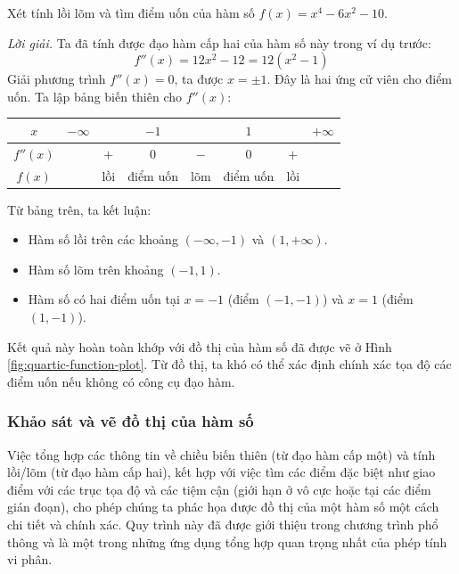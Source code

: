 \begin{example}
Xét tính lồi lõm và tìm điểm uốn của hàm số $f(x) = x^4 - 6x^2 -10$.

\textit{Lời giải.}
Ta đã tính được đạo hàm cấp hai của hàm số này trong ví dụ trước:
$$ f''(x) = 12x^2 - 12 = 12(x^2 - 1) $$
Giải phương trình $f''(x)=0$, ta được $x = \pm 1$. Đây là hai ứng cử viên cho điểm uốn. Ta lập bảng biến thiên cho $f''(x)$:

\begin{center}
\begin{tabular}{c|ccccccc}
$x$ & $-\infty$ & & $-1$ & & $1$ & & $+\infty$ \\
\hline
$f''(x)$ & & $+$ & $0$ & $-$ & $0$ & $+$ & \\
\hline
$f(x)$ & & lồi & điểm uốn & lõm & điểm uốn & lồi & \\
\end{tabular}
\end{center}
Từ bảng trên, ta kết luận:
\begin{itemize}
    \item Hàm số lồi trên các khoảng $(-\infty, -1)$ và $(1, +\infty)$.
    \item Hàm số lõm trên khoảng $(-1, 1)$.
    \item Hàm số có hai điểm uốn tại $x=-1$ (điểm $(-1, -1)$) và $x=1$ (điểm $(1, -1)$).
\end{itemize}
Kết quả này hoàn toàn khớp với đồ thị của hàm số đã được vẽ ở Hình \ref{fig:quartic-function-plot}. Từ đồ thị, ta khó có thể xác định chính xác tọa độ các điểm uốn nếu không có công cụ đạo hàm.
\end{example}

\subsubsection{Khảo sát và vẽ đồ thị của hàm số}
\label{subsubsec:graphing-functions}

Việc tổng hợp các thông tin về chiều biến thiên (từ đạo hàm cấp một) và tính lồi/lõm (từ đạo hàm cấp hai), kết hợp với việc tìm các điểm đặc biệt như giao điểm với các trục tọa độ và các tiệm cận (giới hạn ở vô cực hoặc tại các điểm gián đoạn), cho phép chúng ta phác họa được đồ thị của một hàm số một cách chi tiết và chính xác. Quy trình này đã được giới thiệu trong chương trình phổ thông và là một trong những ứng dụng tổng hợp quan trọng nhất của phép tính vi phân.

